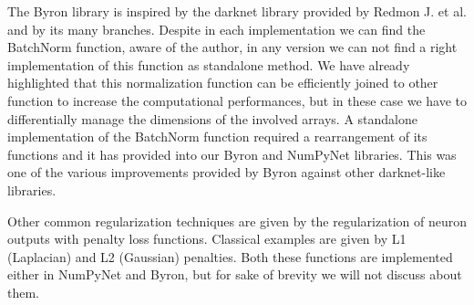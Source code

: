\documentclass{standalone}
\begin{document}
The \textsf{Byron} library is inspired by the \textsf{darknet} library provided by Redmon J. et al. and by its many branches.
Despite in each implementation we can find the BatchNorm function, aware of the author, in any version we can not find a right implementation of this function as standalone method.
We have already highlighted that this normalization function can be efficiently joined to other function to increase the computational performances, but in these case we have to differentially manage the dimensions of the involved arrays.
A standalone implementation of the BatchNorm function required a rearrangement of its functions and it has provided into our \textsf{Byron} and \textsf{NumPyNet} libraries.
This was one of the various improvements provided by \textsf{Byron} against other \textsf{darknet}-like libraries.

Other common regularization techniques are given by the regularization of neuron outputs with penalty loss functions.
Classical examples are given by L1 (Laplacian) and L2 (Gaussian) penalties.
Both these functions are implemented either in \textsf{NumPyNet} and \textsf{Byron}, but for sake of brevity we will not discuss about them.
\end{document}
